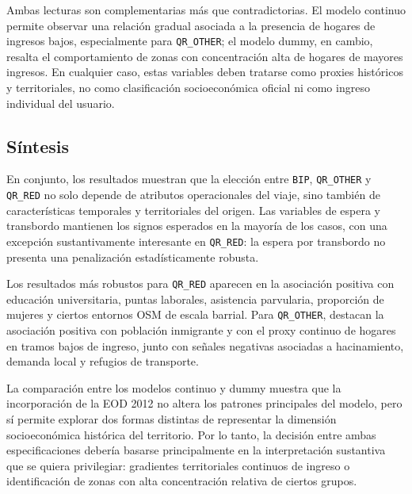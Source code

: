 Ambas lecturas son complementarias más que contradictorias. El modelo continuo permite observar una
relación gradual asociada a la presencia de hogares de ingresos bajos, especialmente para
\texttt{QR\_OTHER}; el modelo dummy, en cambio, resalta el comportamiento de zonas con concentración
alta de hogares de mayores ingresos. En cualquier caso, estas variables deben tratarse como proxies
históricos y territoriales, no como clasificación socioeconómica oficial ni como ingreso individual
del usuario.

\subsection{Síntesis}

En conjunto, los resultados muestran que la elección entre \texttt{BIP}, \texttt{QR\_OTHER} y
\texttt{QR\_RED} no solo depende de atributos operacionales del viaje, sino también de
características temporales y territoriales del origen. Las variables de espera y transbordo mantienen
los signos esperados en la mayoría de los casos, con una excepción sustantivamente interesante en
\texttt{QR\_RED}: la espera por transbordo no presenta una penalización estadísticamente robusta.

Los resultados más robustos para \texttt{QR\_RED} aparecen en la asociación positiva con educación
universitaria, puntas laborales, asistencia parvularia, proporción de mujeres y ciertos entornos OSM
de escala barrial. Para \texttt{QR\_OTHER}, destacan la asociación positiva con población inmigrante
y con el proxy continuo de hogares en tramos bajos de ingreso, junto con señales negativas asociadas
a hacinamiento, demanda local y refugios de transporte.

La comparación entre los modelos continuo y dummy muestra que la incorporación de la EOD 2012 no
altera los patrones principales del modelo, pero sí permite explorar dos formas distintas de
representar la dimensión socioeconómica histórica del territorio. Por lo tanto, la decisión entre
ambas especificaciones debería basarse principalmente en la interpretación sustantiva que se quiera
privilegiar: gradientes territoriales continuos de ingreso o identificación de zonas con alta
concentración relativa de ciertos grupos.
